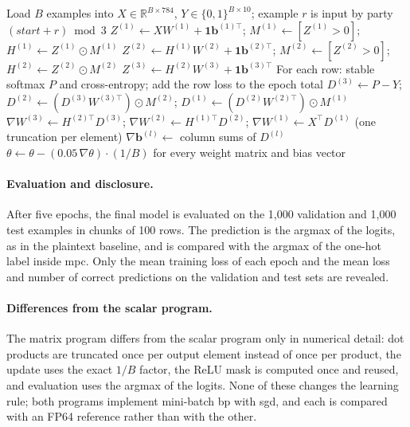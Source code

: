\begin{algorithm}[ht]
\caption{One training batch of the batched-matrix secure \ac{bp} program (all values secret-shared).}
\label{alg:impl-batch}
\begin{algorithmic}[1]
\STATE Load $B$ examples into $X\in\mathbb{R}^{B\times784}$, $Y\in\{0,1\}^{B\times10}$; example $r$ is input by party $(\mathit{start}+r) \bmod 3$
\STATE $Z^{(1)} \leftarrow XW^{(1)}+\mathbf{1}\mathbf{b}^{(1)\top}$; \quad $M^{(1)}\leftarrow[Z^{(1)}>0]$; \quad $H^{(1)}\leftarrow Z^{(1)}\odot M^{(1)}$
\STATE $Z^{(2)} \leftarrow H^{(1)}W^{(2)}+\mathbf{1}\mathbf{b}^{(2)\top}$; \quad $M^{(2)}\leftarrow[Z^{(2)}>0]$; \quad $H^{(2)}\leftarrow Z^{(2)}\odot M^{(2)}$
\STATE $Z^{(3)} \leftarrow H^{(2)}W^{(3)}+\mathbf{1}\mathbf{b}^{(3)\top}$
\STATE For each row: stable softmax $P$ and cross-entropy; add the row loss to the epoch total
\STATE $D^{(3)}\leftarrow P-Y$; \quad $D^{(2)}\leftarrow (D^{(3)}W^{(3)\top})\odot M^{(2)}$; \quad $D^{(1)}\leftarrow (D^{(2)}W^{(2)\top})\odot M^{(1)}$
\STATE $\nabla W^{(3)}\leftarrow H^{(2)\top}D^{(3)}$; \quad $\nabla W^{(2)}\leftarrow H^{(1)\top}D^{(2)}$; \quad $\nabla W^{(1)}\leftarrow X^{\top}D^{(1)}$ (one truncation per element)
\STATE $\nabla\mathbf{b}^{(l)}\leftarrow$ column sums of $D^{(l)}$
\STATE $\theta \leftarrow \theta - (0.05\,\nabla\theta)\cdot(1/B)$ for every weight matrix and bias vector
\end{algorithmic}
\end{algorithm}

\paragraph{Evaluation and disclosure.} After five epochs, the final model is evaluated on the 1{,}000 validation and 1{,}000 test examples in chunks of 100 rows. The prediction is the argmax of the logits, as in the plaintext baseline, and is compared with the argmax of the one-hot label inside \ac{mpc}. Only the mean training loss of each epoch and the mean loss and number of correct predictions on the validation and test sets are revealed.

\paragraph{Differences from the scalar program.} The matrix program differs from the scalar program only in numerical detail: dot products are truncated once per output element instead of once per product, the update uses the exact $1/B$ factor, the ReLU mask is computed once and reused, and evaluation uses the argmax of the logits. None of these changes the learning rule; both programs implement mini-batch \ac{bp} with \ac{sgd}, and each is compared with an FP64 reference rather than with the other.

